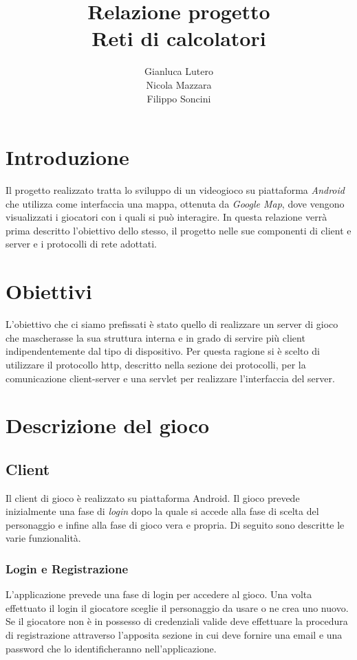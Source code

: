 \documentclass[12pt,a4]{article}
\title{\textbf{Relazione progetto \\ Reti di calcolatori}}
\author{Gianluca Lutero \\  Nicola Mazzara \\ Filippo Soncini}
\date{}
\begin{document}
\maketitle

\newpage
\tableofcontents
\newpage

\section*{Introduzione}
Il progetto realizzato tratta lo sviluppo di un videogioco su piattaforma \textit{Android} che utilizza come interfaccia una mappa, ottenuta da \textit{Google Map}, dove vengono visualizzati i giocatori con i quali si può interagire. In questa relazione verrà prima descritto l'obiettivo dello stesso, il progetto nelle sue componenti di client e server e i protocolli di rete adottati.

\section{Obiettivi}
L'obiettivo che ci siamo prefissati è stato quello di realizzare un server di gioco che mascherasse la sua struttura interna e in grado di servire più client indipendentemente dal tipo di dispositivo. Per questa ragione si è scelto di utilizzare il protocollo http, descritto nella sezione dei protocolli, per la comunicazione client-server e una servlet per realizzare l'interfaccia del server. 

\section{Descrizione del gioco}

\subsection{Client}
Il client di gioco è realizzato su piattaforma Android. Il gioco prevede inizialmente una fase di \textit{login} dopo la quale si accede alla fase di scelta del personaggio e infine alla fase di gioco vera e propria. Di seguito sono descritte le varie funzionalità.

\subsubsection{Login e Registrazione}
L'applicazione prevede una fase di login per accedere al gioco. Una volta effettuato il login il giocatore sceglie il personaggio da usare o ne crea uno nuovo. Se il giocatore non è in possesso di credenziali valide deve effettuare la procedura di registrazione attraverso l'apposita sezione in cui deve fornire una email e una password che lo identificheranno nell'applicazione.
\end{document}
